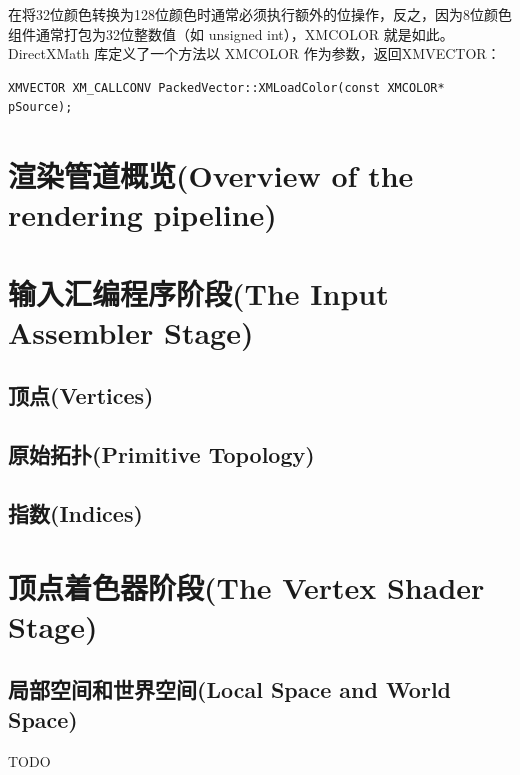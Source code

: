 \documentclass[11pt,a4paper,oldfontcommands]{memoir}
\begin{document}
{\begin{flushleft}
在将32位颜色转换为128位颜色时通常必须执行额外的位操作，反之，因为8位颜色组件通常打包为32位整数值（如 unsigned int），XMCOLOR 就是如此。DirectXMath 库定义了一个方法以 XMCOLOR 作为参数，返回XMVECTOR：
\begin{lstlisting}
XMVECTOR XM_CALLCONV PackedVector::XMLoadColor(const XMCOLOR* pSource);
\end{lstlisting}
\end{flushleft}

\section{渲染管道概览(Overview of the rendering pipeline)}
\section{输入汇编程序阶段(The Input Assembler Stage)}
\subsection{顶点(Vertices)}
\subsection{原始拓扑(Primitive Topology)}
\subsection{指数(Indices)}
\section{顶点着色器阶段(The Vertex Shader Stage)}
\subsection{局部空间和世界空间(Local Space and World Space)}
TODO
}
\end{document}
